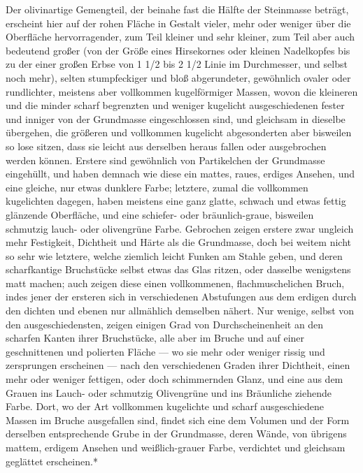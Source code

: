 \documentclass[a4paper, 11pt, oneside, german]{article}
\begin{document}
Der olivinartige Gemengteil, der beinahe fast die Hälfte der Steinmasse beträgt, erscheint hier auf der rohen Fläche in Gestalt vieler, mehr oder weniger über die Oberfläche hervorragender, zum Teil kleiner und sehr kleiner, zum Teil aber auch bedeutend großer (von der Größe eines Hirsekornes oder kleinen Nadelkopfes bis zu der einer großen Erbse von 1 1/2 bis 2 1/2 Linie im Durchmesser, und selbst noch mehr), selten stumpfeckiger und bloß abgerundeter, gewöhnlich ovaler oder rundlichter, meistens aber vollkommen kugelförmiger Massen, wovon die kleineren und die minder scharf begrenzten und weniger kugelicht ausgeschiedenen fester und inniger von der Grundmasse eingeschlossen sind, und gleichsam in dieselbe übergehen, die größeren und vollkommen kugelicht abgesonderten aber bisweilen so lose sitzen, dass sie leicht aus derselben heraus fallen oder ausgebrochen werden können. Erstere sind gewöhnlich von Partikelchen der Grundmasse eingehüllt, und haben demnach wie diese ein mattes, raues, erdiges Ansehen, und eine gleiche, nur etwas dunklere Farbe; letztere, zumal die vollkommen kugelichten dagegen, haben meistens eine ganz glatte, schwach und etwas fettig glänzende Oberfläche, und eine schiefer- oder bräunlich-graue, bisweilen schmutzig lauch- oder olivengrüne Farbe. Gebrochen zeigen erstere zwar ungleich mehr Festigkeit, Dichtheit und Härte als die Grundmasse, doch bei weitem nicht so sehr wie letztere, welche ziemlich leicht Funken am Stahle geben, und deren scharfkantige Bruchstücke selbst etwas das Glas ritzen, oder dasselbe wenigstens matt machen; auch zeigen diese einen vollkommenen, flachmuschelichen Bruch, indes jener der ersteren sich in verschiedenen Abstufungen aus dem erdigen durch den dichten und ebenen nur allmählich demselben nähert. Nur wenige, selbst von den ausgeschiedensten, zeigen einigen Grad von Durchscheinenheit an den scharfen Kanten ihrer Bruchstücke, alle aber im Bruche und auf einer geschnittenen und polierten Fläche --- wo sie mehr oder weniger rissig und zersprungen erscheinen --- nach den verschiedenen Graden ihrer Dichtheit, einen mehr oder weniger fettigen, oder doch schimmernden Glanz, und eine aus dem Grauen ins Lauch- oder schmutzig Olivengrüne und ins Bräunliche ziehende Farbe. Dort, wo der Art vollkommen kugelichte und scharf ausgeschiedene Massen im Bruche ausgefallen sind, findet sich eine dem Volumen und der Form derselben entsprechende Grube in der Grundmasse, deren Wände, von übrigens mattem, erdigem Ansehen und weißlich-grauer Farbe, verdichtet und gleichsam geglättet erscheinen.*
\end{document}

